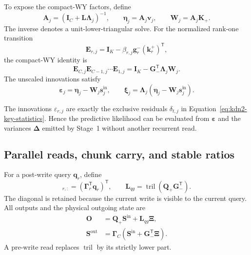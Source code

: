 \documentclass[11pt]{article}
\newcommand{\ve}[1]{\boldsymbol{#1}}
\newcommand{\tr}{\mathsf{T}}
\begin{document}
To expose the compact-WY factors, define
\begin{equation}
  \ve{A}_j
  =(\ve{I}_C+\ve{L}\ve{\Lambda}_j)^{-1},
  \qquad
  \ve{\eta}_j=\ve{A}_j\ve{v}_j,
  \qquad
  \ve{W}_j=\ve{A}_j\ve{K}_{+}.
  \label{eq:kdn2-chunk-wy-factors}
\end{equation}
The inverse denotes a unit-lower-triangular solve.  For the normalized rank-one transition
\begin{equation}
  \ve{E}_{r,j}
  =\ve{I}_K
   -\beta_{r,j}\ve{g}^{-}_r(\ve{k}^{+}_r)^{\tr},
  \label{eq:kdn2-chunk-rank-one-transition}
\end{equation}
the compact-WY identity is
\begin{equation}
  \ve{E}_{C,j}\ve{E}_{C-1,j}\cdots\ve{E}_{1,j}
  =\ve{I}_K-\ve{G}_{-}^{\tr}\ve{\Lambda}_j\ve{W}_j.
  \label{eq:kdn2-chunk-compact-wy-identity}
\end{equation}
The unscaled innovations satisfy
\begin{equation}
  \ve{\varepsilon}_j
  =\ve{\eta}_j-\ve{W}_j\ve{s}^{\mathrm{in}}_j,
  \qquad
  \ve{\xi}_j
  =\ve{\Lambda}_j
   (\ve{\eta}_j-\ve{W}_j\ve{s}^{\mathrm{in}}_j).
  \label{eq:kdn2-chunk-wy-innovation}
\end{equation}

The innovations $\varepsilon_{r,j}$ are exactly the exclusive residuals $\delta_{t,j}$ in
Equation~\eqref{eq:kdn2-key-statistics}.  Hence the predictive likelihood can be evaluated from
$\ve{\varepsilon}$ and the variances $\ve{\Delta}$ emitted by Stage~1 without another recurrent
read.

\subsection{Parallel reads, chunk carry, and stable ratios}
\label{app:kdn2-chunk-reads}

For a post-write query $\ve{q}_r$, define
\begin{equation}
  [\ve{Q}_{+}]_{r,:}
  =(\ve{\Gamma}_r^{\tr}\ve{q}_r)^{\tr},
  \qquad
  \ve{L}_{qg}
  =\operatorname{tril}(\ve{Q}_{+}\ve{G}_{-}^{\tr}).
  \label{eq:kdn2-chunk-query-interaction}
\end{equation}
The diagonal is retained because the current write is visible to the current query.  All outputs
and the physical outgoing state are
\begin{equation}
\begin{aligned}
  \ve{O}
  &=\ve{Q}_{+}\ve{S}^{\mathrm{in}}+\ve{L}_{qg}\ve{\Xi},
  \\
  \ve{S}^{\mathrm{out}}
  &=\ve{\Gamma}_C
    \left(
      \ve{S}^{\mathrm{in}}+\ve{G}_{-}^{\tr}\ve{\Xi}
    \right).
\end{aligned}
  \label{eq:kdn2-chunk-outputs-state}
\end{equation}
A pre-write read replaces $\operatorname{tril}$ by its strictly lower part.
\end{document}
